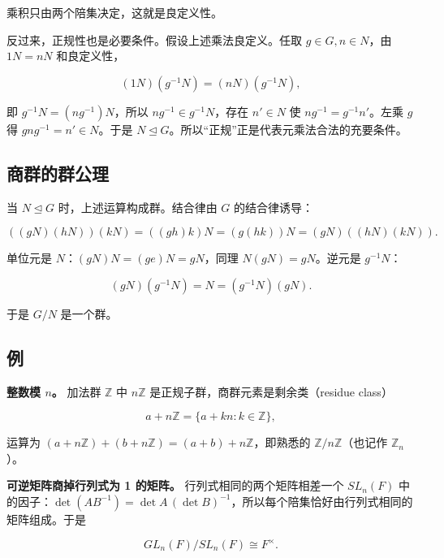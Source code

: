 乘积只由两个陪集决定，这就是良定义性。

反过来，正规性也是必要条件。假设上述乘法良定义。任取 $g\in G,n\in N$，由 $1N=nN$ 和良定义性，

\[(1N)(g^{-1}N)=(nN)(g^{-1}N),\]

即 $g^{-1}N=(ng^{-1})N$，所以 $ng^{-1}\in g^{-1}N$，存在 $n'\in N$ 使 $ng^{-1}=g^{-1}n'$。左乘 $g$ 得 $gng^{-1}=n'\in N$。于是 $N\trianglelefteq G$。所以“正规”正是代表元乘法合法的充要条件。

\subsection{商群的群公理}


当 $N\trianglelefteq G$ 时，上述运算构成群。结合律由 $G$ 的结合律诱导：

\[((gN)(hN))(kN)=((gh)k)N=(g(hk))N=(gN)((hN)(kN)).\]

单位元是 $N$：$(gN)N=(ge)N=gN$，同理 $N(gN)=gN$。逆元是 $g^{-1}N$：

\[(gN)(g^{-1}N)=N=(g^{-1}N)(gN).\]

于是 $G/N$ 是一个群。

\subsection{例}


\textbf{整数模 $n$。} 加法群 $\mathbb Z$ 中 $n\mathbb Z$ 是正规子群，商群元素是剩余类（residue class）

\[a+n\mathbb Z=\{a+kn:k\in\mathbb Z\},\]

运算为 $(a+n\mathbb Z)+(b+n\mathbb Z)=(a+b)+n\mathbb Z$，即熟悉的 $\mathbb Z/n\mathbb Z$（也记作 $\mathbb Z_n$）。

\textbf{可逆矩阵商掉行列式为 1 的矩阵。} 行列式相同的两个矩阵相差一个 $SL_n(F)$ 中的因子：$\det(AB^{-1})=\det A\,(\det B)^{-1}$，所以每个陪集恰好由行列式相同的矩阵组成。于是

\[GL_n(F)/SL_n(F)\cong F^\times.\]
